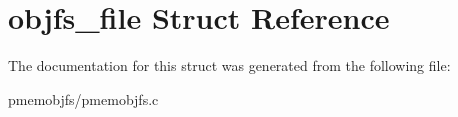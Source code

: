 \hypertarget{structobjfs__file}{}\section{objfs\+\_\+file Struct Reference}
\label{structobjfs__file}


The documentation for this struct was generated from the following file\+:\begin{DoxyCompactItemize}
\item 
pmemobjfs/pmemobjfs.\+c\end{DoxyCompactItemize}
